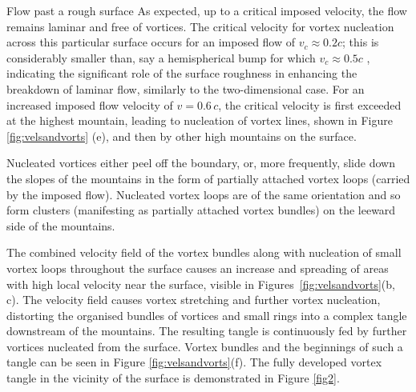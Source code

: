 \begin{chapter}{\label{cha:afm}Flow past a rough surface}
As expected, up to a critical imposed velocity, the flow remains laminar and free of vortices.  The critical velocity for vortex nucleation across this particular surface occurs for an imposed flow of $v_c\approx 0.2 c$; this is considerably smaller than, say a hemispherical bump for which $v_c \approx 0.5 c$ \cite{win01},  indicating the significant role of the surface roughness in enhancing the breakdown of laminar flow, similarly to the two-dimensional case. For an increased imposed flow velocity of $v=0.6\,c$, the critical velocity is first exceeded at the highest mountain, leading to nucleation of vortex lines, shown in Figure \ref{fig:velsandvorts} (e), and then by other high mountains on the surface.

Nucleated vortices either peel off the boundary, or, more frequently, slide
down the slopes of the mountains in the form of partially attached vortex loops (carried by the imposed flow). Nucleated vortex loops are of the same orientation and so form clusters (manifesting as partially attached vortex bundles) on the leeward side of the mountains.

The combined velocity field of the vortex bundles along with nucleation of small vortex loops throughout the surface causes an increase and spreading of areas with high local velocity near the surface, visible in Figures~\ref{fig:velsandvorts}(b, c). The velocity field causes vortex stretching and further vortex nucleation, distorting the organised bundles of vortices and small rings into a complex tangle downstream of the mountains. The resulting tangle is continuously fed by further vortices nucleated from the surface. Vortex bundles and the beginnings of such a tangle can be seen in Figure \ref{fig:velsandvorts}(f). The fully developed vortex tangle in the vicinity of the surface is demonstrated in Figure \ref{fig2}.


\end{chapter}
